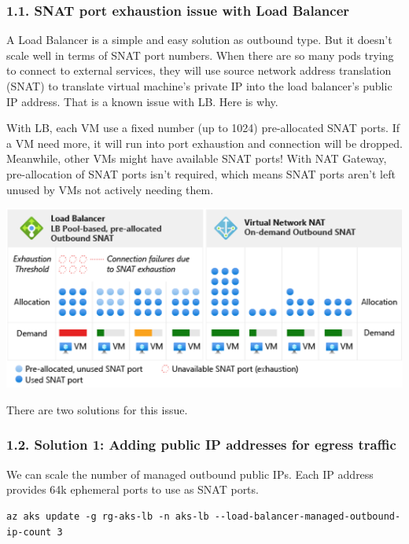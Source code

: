 \documentclass[
]{article}
\begin{document}
\hypertarget{snat-port-exhaustion-issue-with-load-balancer}{%
\subsubsection{1.1. SNAT port exhaustion issue with Load
Balancer}\label{snat-port-exhaustion-issue-with-load-balancer}}

A Load Balancer is a simple and easy solution as outbound type. But it
doesn't scale well in terms of SNAT port numbers. When there are so many
pods trying to connect to external services, they will use source
network address translation (SNAT) to translate virtual machine's
private IP into the load balancer's public IP address. That is a known
issue with LB. Here is why.

With LB, each VM use a fixed number (up to 1024) pre-allocated SNAT
ports. If a VM need more, it will run into port exhaustion and
connection will be dropped. Meanwhile, other VMs might have available
SNAT ports! With NAT Gateway, pre-allocation of SNAT ports isn't
required, which means SNAT ports aren't left unused by VMs not actively
needing them.

\includegraphics{images/65_aks_egress_lb_natgw_udr__snat-issue.png}

There are two solutions for this issue.

\hypertarget{solution-1-adding-public-ip-addresses-for-egress-traffic}{%
\subsubsection{1.2. Solution 1: Adding public IP addresses for egress
traffic}\label{solution-1-adding-public-ip-addresses-for-egress-traffic}}

We can scale the number of managed outbound public IPs. Each IP address
provides 64k ephemeral ports to use as SNAT ports.

\begin{lstlisting}
az aks update -g rg-aks-lb -n aks-lb --load-balancer-managed-outbound-ip-count 3
\end{lstlisting}
\end{document}
